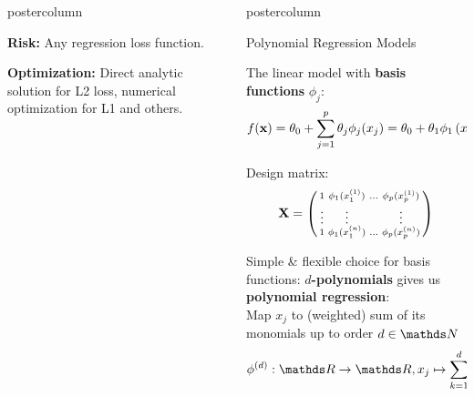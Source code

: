 \documentclass{beamer}
\newlength{\columnheight} %
\begin{document}
\begin{frame}[fragile]{}
\begin{columns}
\begin{column}{.31\textwidth}
\begin{beamercolorbox}[center]{postercolumn}
\begin{minipage}{.98\textwidth}
{\begin{myblock}
  \vspace*{1ex}
  
  \textbf{Risk:} Any regression loss function.
  
  \vspace*{1ex}
  
  \textbf{Optimization:} Direct analytic solution for L2 loss, numerical optimization for L1 and others.
  \end{myblock}
  
}
\end{minipage}
\end{beamercolorbox}
\end{column}
\begin{column}{.31\textwidth}
\begin{beamercolorbox}[center]{postercolumn}
\begin{minipage}{.98\textwidth}
\parbox[t][\columnheight]{\textwidth}{
  \begin{myblock}{Polynomial Regression Models}
  
   The linear model with \textbf{basis functions} $\phi_j$:
    \begin{equation*} \label{true_lm}
      f(\mathbf{x}) = \theta_0 + \sum\limits_{j=1}^p \theta_j \phi_j (x_j)
      = \theta_0 + \theta_1  \phi_1 \left( x_1 \right)
      + \dots + \theta_p \phi_p \left(x_p \right)
    \end{equation*}

    Design matrix:
\begin{align*}
  \mathbf{X} =
  \left(
    \begin{smallmatrix}
        1 & \textcolor{black}{\phi_1} (x^{(1)}_1) & \ldots &
        \textcolor{black}{\phi_p} (x^{(1)}_p) \\
        \vdots & \vdots & & \vdots \\
        1 & \textcolor{black}{\phi_1} (x^{(n)}_1) & \ldots &
        \textcolor{black}{\phi_p} (x^{(n)}_p) \\
    \end{smallmatrix}
    \right)
\end{align*}

Simple \& flexible choice for basis functions: \textbf{$d$-polynomials} gives us \textbf{polynomial regression}:\\
Map $x_j$ to (weighted) sum of its monomials up to order $d \in \N$
$$ \phi^{(d)}: \R \rightarrow \R, x_j \mapsto \sum_{k = 1}^d \beta_k x_j^k$$


\end{myblock}}
\end{minipage}
\end{beamercolorbox}
\end{column}
\end{columns}
\end{frame}
\end{document}
